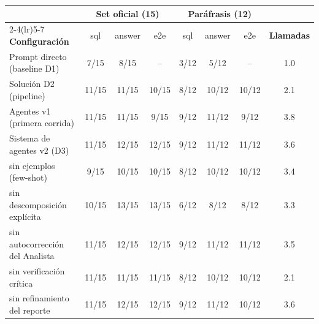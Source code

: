 \begin{tabular}{@{}lccccccc@{}}
\toprule
& \multicolumn{3}{c}{\textbf{Set oficial (15)}} & \multicolumn{3}{c}{\textbf{Paráfrasis (12)}} & \\
\cmidrule(lr){2-4}\cmidrule(lr){5-7}
\textbf{Configuración} & sql & answer & e2e & sql & answer & e2e & \textbf{Llamadas} \\
\midrule
Prompt directo (baseline D1) & 7/15 & 8/15 & -- & 3/12 & 5/12 & -- & 1.0 \\
Solución D2 (pipeline) & 11/15 & 11/15 & 10/15 & 8/12 & 10/12 & 10/12 & 2.1 \\
\addlinespace
Agentes v1 (primera corrida) & 11/15 & 11/15 & 9/15 & 9/12 & 11/12 & 9/12 & 3.8 \\
Sistema de agentes v2 (D3) & 11/15 & 12/15 & 12/15 & 9/12 & 11/12 & 11/12 & 3.6 \\
\addlinespace
\quad sin ejemplos (few-shot) & 9/15 & 10/15 & 10/15 & 8/12 & 10/12 & 10/12 & 3.4 \\
\quad sin descomposición explícita & 10/15 & 13/15 & 13/15 & 6/12 & 8/12 & 8/12 & 3.3 \\
\quad sin autocorrección del Analista & 11/15 & 12/15 & 12/15 & 9/12 & 11/12 & 11/12 & 3.5 \\
\quad sin verificación crítica & 11/15 & 11/15 & 11/15 & 8/12 & 10/12 & 10/12 & 2.1 \\
\quad sin refinamiento del reporte & 11/15 & 12/15 & 12/15 & 9/12 & 11/12 & 10/12 & 3.6 \\
\bottomrule
\end{tabular}
